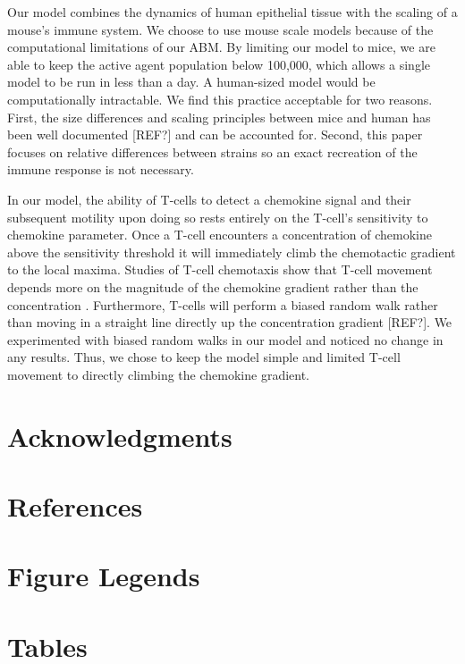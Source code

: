 \documentclass[10pt]{article}
\begin{document}
Our model combines the dynamics of human epithelial tissue with the scaling of a mouse's immune system.  We choose to use mouse scale models because of the computational limitations of our ABM.  By limiting our model to mice, we are able to keep the active agent population below 100,000, which allows a single model to be run in less than a day.  A human-sized model would be computationally intractable.  We find this practice acceptable for two reasons.  First, the size differences and scaling principles between mice and human has been well documented [REF?] and can be accounted for.  Second, this paper focuses on relative differences between strains so an exact recreation of the immune response is not necessary.

In our model, the ability of T-cells to detect a chemokine signal and their subsequent motility upon doing so rests entirely on the T-cell's sensitivity to chemokine parameter.  Once a T-cell encounters a concentration of chemokine above the sensitivity threshold it will immediately climb the chemotactic gradient to the local maxima.  Studies of T-cell chemotaxis show that T-cell movement depends more on the magnitude of the chemokine gradient rather than the concentration \cite{Gao2003}.  Furthermore, T-cells will perform a biased random walk rather than moving in a straight line directly up the concentration gradient [REF?].  We experimented with biased random walks in our model and noticed no change in any results.  Thus, we chose to keep the model simple and limited T-cell movement to directly climbing the chemokine gradient.

\section*{Acknowledgments}


\section*{References}


\section*{Figure Legends}


\section*{Tables}
\end{document}
